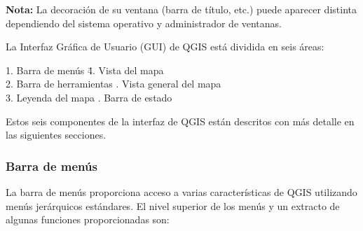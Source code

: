 \textbf{Nota:} La decoración de su ventana (barra de título, etc.) puede aparecer 
distinta dependiendo del sistema operativo y administrador de ventanas.

La Interfaz Gráfica de Usuario (GUI) de QGIS está dividida en seis áreas:

\begin{tabbing}
1. Barra de menús \hspace{3cm}\= 4. Vista del mapa \\
2. Barra de herramientas \hspace{3cm}. Vista general del mapa \\
3. Leyenda del mapa \hspace{3cm}. Barra de estado   
\end{tabbing}

Estos seis componentes de la interfaz de QGIS están descritos con más detalle
en las siguientes secciones.

\subsubsection{Barra de menús}\label{label_menubar}

La barra de menús proporciona acceso a varias características de QGIS utilizando 
menús jerárquicos estándares. El nivel superior de los menús y un extracto de 
algunas funciones proporcionadas son:

